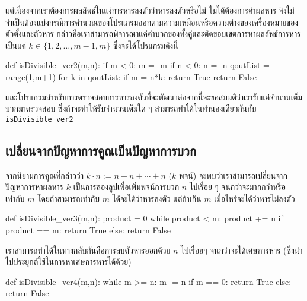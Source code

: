 แต่เนื่องจากเราต้องการผลลัพธ์ในแง่การหารลงตัวว่าหารลงตัวหรือไม่ ไม่ได้ต้องการค่าผลหาร จึงไม่จำเป็นต้องแบ่งกรณีการคำนวณของโปรแกรมออกตามความเหมือนหรือความต่างของเครื่องหมายของตัวตั้งและตัวหาร กล่าวคือเราสามารถพิจารณาแค่ค่าบวกของทั้งคู่และตัดขอบเขตการหาผลลัพธ์การหารเป็นแค่ $k\in \{1,2, \dots, m-1, m\}$ ซึ่งจะได้โปรแกรมดังนี้
\begin{python*}
def isDivisible_ver2(m,n):
    if m < 0:
        m = -m
    if n < 0:
        n = -n
    qoutList = range(1,m+1)
    for k in qoutList:
        if m = n*k:
            return True
    return False
\end{python*}
และโปรแกรมสำหรับการตรวจสอบการหารลงตัวที่จะพัฒนาต่อจากนี้จะขอสมมติว่าเรารับแค่จำนวนเต็มบวกมาตรวจสอบ ซึ่งถ้าจะทำให้รับจำนวนเต็มใด ๆ สามารถทำได้ในทำนองเดียวกันกับ \texttt{isDivisible\_ver2}

\subsection{เปลี่ยนจากปัญหาการคูณเป็นปัญหาการบวก}
จากนิยามการคูณที่กล่าวว่า $k\cdot n := n + n + \cdots + n$ ($k$ พจน์) จะพบว่าเราสามารถเปลี่ยนจากปัญหาการหาผลหาร $k$ เป็นการลองลูปเพื่อเพิ่มพจน์การบวก $n$ ไปเรื่อย ๆ จนกว่าจะมากกว่าหรือเท่ากับ $m$ โดยถ้าสามารถเท่ากับ $m$ ได้จะได้ว่าหารลงตัว แต่ถ้าเกิน $m$ เมื่อไหร่จะได้ว่าหารไม่ลงตัว
\begin{python*}
def isDivisible_ver3(m,n):
    product = 0
    while product < m:
        product += n
    if product == m:
        return True
    else:
        return False
\end{python*}
เราสามารถทำได้ในทางกลับกันคือการลบตัวหารออกด้วย $n$ ไปเรื่อยๆ จนกว่าจะได้เศษการหาร (ซึ่งนำไปประยุกต์ใช้ในการหาเศษการหารได้ด้วย)
\begin{python*}
def isDivisible_ver4(m,n):
    while m >= n:
        m -= n
    if m == 0:
        return True
    else:
        return False
\end{python*}

